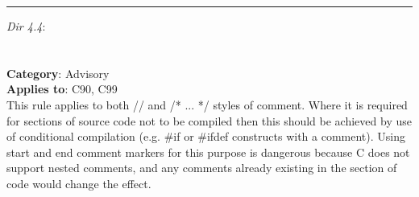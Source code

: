 \noindent\rule{\textwidth}{0.1pt}

\emph{Dir 4.4}:\\

\noindent{}
\\\\
\textbf{Category}: Advisory\\
\textbf{Applies to}: C90, C99\\

This rule applies to both // and /* ... */ styles of comment.
Where it is required for sections of source code not to be compiled then this should be achieved by use of conditional compilation (e.g. \#if or \#ifdef constructs with a comment). Using start and end comment markers for this purpose is dangerous because C does not support nested comments, and any comments already existing in the section of code would change the effect.